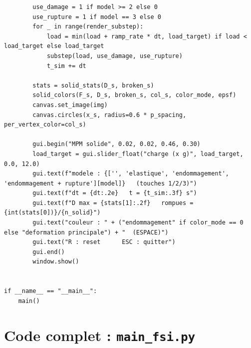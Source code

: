 \documentclass[11pt,a4paper]{article}
\begin{document}
\begin{lstlisting}
        use_damage = 1 if model >= 2 else 0
        use_rupture = 1 if model == 3 else 0
        for _ in range(render_substep):
            load = min(load + ramp_rate * dt, load_target) if load < load_target else load_target
            substep(load, use_damage, use_rupture)
            t_sim += dt

        stats = solid_stats(D_s, broken_s)
        solid_colors(F_s, D_s, broken_s, col_s, color_mode, epsf)
        canvas.set_image(img)
        canvas.circles(x_s, radius=0.6 * p_spacing, per_vertex_color=col_s)

        gui.begin("MPM solide", 0.02, 0.02, 0.46, 0.30)
        load_target = gui.slider_float("charge (x g)", load_target, 0.0, 12.0)
        gui.text(f"modele : {['', 'elastique', 'endommagement', 'endommagement + rupture'][model]}   (touches 1/2/3)")
        gui.text(f"dt = {dt:.2e}   t = {t_sim:.3f} s")
        gui.text(f"D max = {stats[1]:.2f}   rompues = {int(stats[0])}/{n_solid}")
        gui.text("couleur : " + ("endommagement" if color_mode == 0 else "deformation principale") + "  (ESPACE)")
        gui.text("R : reset      ESC : quitter")
        gui.end()
        window.show()


if __name__ == "__main__":
    main()
\end{lstlisting}

\section{Code complet : \texttt{main\_fsi.py}}
\label{app:fsi}
\end{document}
